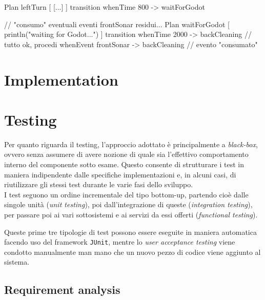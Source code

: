 \documentclass{../llncs}
\newcommand{\labelsec}[1]{\label{sec:#1}}
\newcommand{\labelsssec}[1]{\label{sssec:#1}}
\begin{document}
\begin{qacode}[caption={SoftwareAgent, pt12}]
Plan leftTurn [
	[...]
]
transition
	whenTime 800 -> waitForGodot

// "consumo" eventuali eventi frontSonar residui...
Plan waitForGodot [
	println("waiting for Godot...")
]
transition
	whenTime 2000 -> backCleaning // tutto ok, procedi
	whenEvent frontSonar -> backCleaning // evento "consumato"
\end{qacode}

\section{Implementation}
\labelsec{Implementation}

\section{Testing}
\labelsec{Testing}

Per quanto riguarda il testing, l'approccio adottato è principalmente a \emph{black-box}, ovvero senza assumere di avere nozione di quale sia l'effettivo comportamento interno del componente sotto esame. Questo consente di strutturare i test in maniera indipendente dalle specifiche implementazioni e, in alcuni casi, di riutilizzare gli stessi test durante le varie fasi dello sviluppo.\\

I test seguono un ordine incrementale del tipo bottom-up, partendo cioè dalle singole unità (\emph{unit testing}), poi dall'integrazione di queste (\emph{integration testing}), per passare poi ai vari sottosistemi e ai servizi da essi offerti (\emph{functional testing}).

Queste prime tre tipologie di test possono essere eseguite in maniera automatica facendo uso del framework \texttt{JUnit}, mentre lo \emph{user acceptance testing} viene condotto manualmente man mano che un nuovo pezzo di codice viene aggiunto al sistema.

\subsection{Requirement analysis}
\labelsssec{reqAnalTesting}
\end{document}
